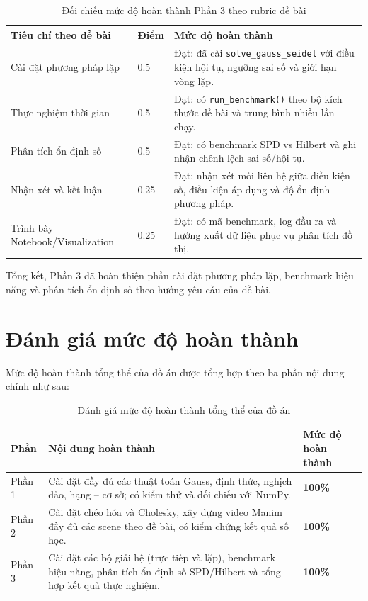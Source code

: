 \documentclass[a4paper]{article}
\begin{document}
\begin{table}[H]
\centering
\small
\begin{tabular}{|p{}|p{}|p{}|}
\hline
\textbf{Tiêu chí theo đề bài} & \textbf{Điểm} & \textbf{Mức độ hoàn thành} \\\hline
Cài đặt phương pháp lặp & 0.5 & Đạt: đã cài \texttt{solve\_gauss\_seidel} với điều kiện hội tụ, ngưỡng sai số và giới hạn vòng lặp. \\\hline
Thực nghiệm thời gian & 0.5 & Đạt: có \texttt{run\_benchmark()} theo bộ kích thước đề bài và trung bình nhiều lần chạy. \\\hline
Phân tích ổn định số & 0.5 & Đạt: có benchmark SPD vs Hilbert và ghi nhận chênh lệch sai số/hội tụ. \\\hline
Nhận xét và kết luận & 0.25 & Đạt: nhận xét mối liên hệ giữa điều kiện số, điều kiện áp dụng và độ ổn định phương pháp. \\\hline
Trình bày Notebook/Visualization & 0.25 & Đạt: có mã benchmark, log đầu ra và hướng xuất dữ liệu phục vụ phân tích đồ thị. \\\hline
\end{tabular}
\caption{Đối chiếu mức độ hoàn thành Phần 3 theo rubric đề bài}
\label{tab:part3_rubric}
\end{table}

Tổng kết, Phần 3 đã hoàn thiện phần cài đặt phương pháp lặp, benchmark hiệu năng và phân tích ổn định số theo hướng yêu cầu của đề bài.



\section{Đánh giá mức độ hoàn thành}

Mức độ hoàn thành tổng thể của đồ án được tổng hợp theo ba phần nội dung chính như sau:

\begin{table}[H]
\centering
\small
\begin{tabular}{|p{}|p{}|p{}|}
\hline
\textbf{Phần} & \textbf{Nội dung hoàn thành} & \textbf{Mức độ hoàn thành} \\\hline
Phần 1 & Cài đặt đầy đủ các thuật toán Gauss, định thức, nghịch đảo, hạng -- cơ sở; có kiểm thử và đối chiếu với NumPy. & \textbf{100\%} \\\hline
Phần 2 & Cài đặt chéo hóa và Cholesky, xây dựng video Manim đầy đủ các scene theo đề bài, có kiểm chứng kết quả số học. & \textbf{100\%} \\\hline
Phần 3 & Cài đặt các bộ giải hệ (trực tiếp và lặp), benchmark hiệu năng, phân tích ổn định số SPD/Hilbert và tổng hợp kết quả thực nghiệm. & \textbf{100\%} \\\hline
\end{tabular}
\caption{Đánh giá mức độ hoàn thành tổng thể của đồ án}
\label{tab:overall_completion}
\end{table}
\end{document}
